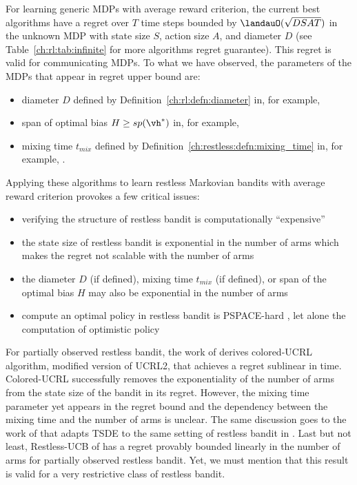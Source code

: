 For learning generic MDPs with average reward criterion, the current best algorithms have a regret over $T$ time steps bounded by $\landauO(\sqrt{DSAT})$ in the unknown MDP with state size $S$, action size $A$, and diameter $D$ (see Table~\ref{ch:rl:tab:infinite} for more algorithms regret guarantee).
This regret is valid for communicating MDPs.
To what we have observed, the parameters of the MDPs that appear in regret upper bound are:
\begin{itemize}
    \item diameter $D$ defined by Definition~\ref{ch:rl:defn:diameter} in, for example, \cite{jaksch2010near, fruit2020improved, tossou2019near}
    \item span of optimal bias $H\ge sp(\vh^*)$ in, for example, \cite{bartlett2012regal, ouyang2017learning, fruit2018efficient, zhang2019regret}
    \item mixing time $t_{mix}$ defined by Definition~\ref{ch:restless:defn:mixing_time} in, for example, \cite{ortner2020regret}.
\end{itemize}
Applying these algorithms to learn restless Markovian bandits with average reward criterion provokes a few critical issues:
\begin{itemize}
    \item verifying the structure of restless bandit is computationally ``expensive'' 
    \item the state size of restless bandit is exponential in the number of arms which makes the regret not scalable with the number of arms
    \item the diameter $D$ (if defined), mixing time $t_{mix}$ (if defined), or span of the optimal bias $H$ may also be exponential in the number of arms
    \item compute an optimal policy in restless bandit is PSPACE-hard \cite{papadimitriou1994complexity}, let alone the computation of optimistic policy
\end{itemize}

For partially observed restless bandit, the work of \cite{ortner2012regret} derives colored-UCRL algorithm, modified version of UCRL2, that achieves a regret sublinear in time.
Colored-UCRL successfully removes the exponentiality of the number of arms from the state size of the bandit in its regret.
However, the mixing time parameter yet appears in the regret bound and the dependency between the mixing time and the number of arms is unclear.
The same discussion goes to the work of \cite{jung2019thompson} that adapts TSDE to the same setting of restless bandit in \cite{ortner2012regret}.
Last but not least, Restless-UCB of \cite{wang2020restless} has a regret provably bounded linearly in the number of arms for partially observed restless bandit.
Yet, we must mention that this result is valid for a very restrictive class of restless bandit.


